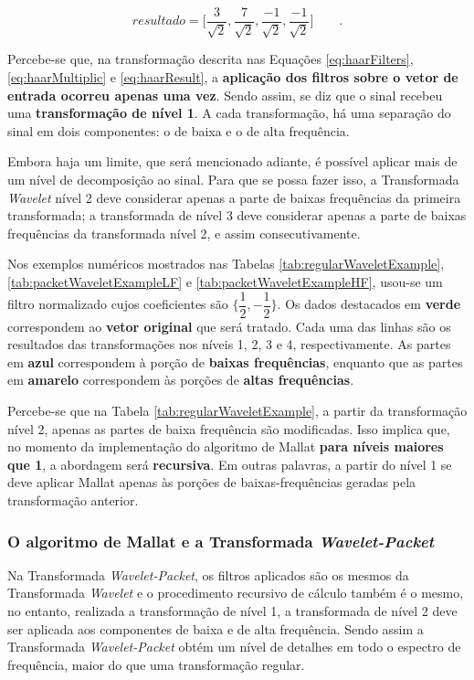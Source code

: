 			\begin{equation}
				resultado = \Big[
				\frac{3}{\sqrt{2}},
				\frac{7}{\sqrt{2}},
				\frac{-1}{\sqrt{2}},
				\frac{-1}{\sqrt{2}}
				\Big]\qquad.
				\label{eq:haarResult}
			\end{equation}
			
			\par Percebe-se que, na transformação descrita nas Equações \ref{eq:haarFilters}, \ref{eq:haarMultiplic} e \ref{eq:haarResult}, a \textbf{aplicação dos filtros sobre o vetor de entrada ocorreu apenas uma vez}. Sendo assim, se diz que o sinal recebeu uma \textbf{transformação de nível 1}. A cada transformação, há uma separação do sinal em dois componentes: o de baixa e o de alta frequência.
			
			\par Embora haja um limite, que será mencionado adiante, é possível aplicar mais de um nível de decomposição ao sinal. Para que se possa fazer isso, a Transformada \textit{Wavelet} nível 2 deve considerar apenas a parte de baixas frequências da primeira transformada; a transformada de nível 3 deve considerar apenas a parte de baixas frequências da transformada nível 2, e assim consecutivamente.
			
			\par Nos exemplos numéricos mostrados nas Tabelas \ref{tab:regularWaveletExample}, \ref{tab:packetWaveletExampleLF} e \ref{tab:packetWaveletExampleHF}, usou-se um filtro normalizado cujos coeficientes são $\{\dfrac{1}{2},-\dfrac{1}{2}\}$. Os dados destacados em \textbf{verde} correspondem ao \textbf{vetor original} que será tratado. Cada uma das linhas são os resultados das transformações nos níveis 1, 2, 3 e 4, respectivamente. As partes em \textbf{azul} correspondem à porção de \textbf{baixas frequências}, enquanto que as partes em \textbf{amarelo} correspondem às porções de \textbf{altas frequências}.
			
			\par Percebe-se que na Tabela \ref{tab:regularWaveletExample}, a partir da transformação nível 2, apenas as partes de baixa frequência são modificadas. Isso implica que, no momento da implementação do algoritmo de Mallat \textbf{para níveis maiores que 1}, a abordagem será \textbf{recursiva}. Em outras palavras, a partir do nível 1 se deve aplicar Mallat apenas às porções de baixas-frequências geradas pela transformação anterior.
			
			

		\subsubsection{O algoritmo de Mallat e a Transformada \textit{Wavelet-Packet}}
			\par Na Transformada \textit{Wavelet-Packet}, os filtros aplicados são os mesmos da Transformada \textit{Wavelet} e o procedimento recursivo de cálculo também é o mesmo, no entanto, realizada a transformação de nível 1, a transformada de nível 2 deve ser aplicada aos componentes de baixa e de alta frequência. Sendo assim a Transformada \textit{Wavelet-Packet} obtém um nível de detalhes em todo o espectro de frequência, maior do que uma transformação regular. 
			
